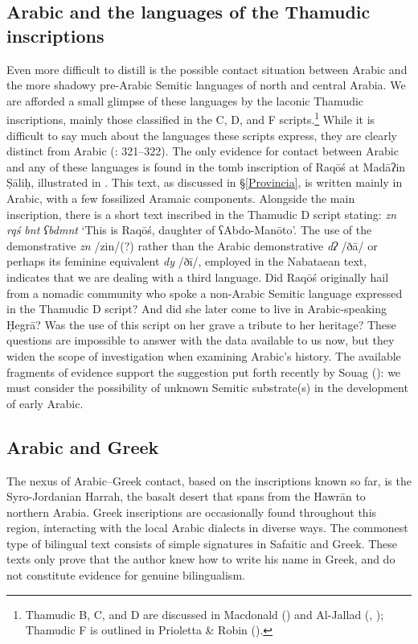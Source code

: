 \documentclass[output=paper]{langsci/langscibook}
\begin{document}
\subsection{Arabic and the languages of the Thamudic inscriptions}
Even more difficult to distill is the possible contact situation between Arabic and the more shadowy pre-Arabic Semitic languages of north and central Arabia. We are afforded a small glimpse of these languages by the laconic Thamudic inscriptions, mainly those classified in the C, D, and F scripts.\footnote{Thamudic B, C, and D are discussed in Macdonald (\citeyear{Macdonald2000}) and Al-Jallad (\citeyear{Al-Jallad2017early}, \citeyear{Al-Jallad2018ANA}); Thamudic F is outlined in Prioletta \& Robin (\citeyear{PriolettaRobin2018}).}  While it is difficult to say much about the languages these scripts express, they are clearly distinct from Arabic (\citealt{Al-Jallad2017early}: 321--322). The only evidence for contact between Arabic and any of these languages is found in the tomb inscription of Raqōś at Madāʔin Ṣāliḥ, illustrated in . This text, as discussed in §\ref{Provincia}, is written mainly in Arabic, with a few fossilized Aramaic components. Alongside the main inscription, there is a short text inscribed in the Thamudic D script stating: \textit{zn rqś bnt ʕbdmnt} ‘This is Raqōś, daughter of ʕAbdo-Manōto’. The use of the demonstrative \textit{zn} /zin/(?) rather than the Arabic demonstrative \textit{dʔ} /ðā/ or perhaps its feminine equivalent \textit{dy} /ðī/, employed in the Nabataean text, indicates that we are dealing with a third language. Did Raqōś originally hail from a nomadic community who spoke a non-Arabic Semitic language expressed in the Thamudic D script? And did she later come to live in Arabic-speaking Ḥegrā? Was the use of this script on her grave a tribute to her heritage? These questions are impossible to answer with the data available to us now, but they widen the scope of investigation when examining Arabic’s history. The available fragments of evidence support the suggestion put forth recently by Souag (\citeyear{Souag2018blog}): we must consider the possibility of unknown Semitic substrate(s) in the development of early Arabic.

\subsection{Arabic and Greek}
The nexus of Arabic--Greek contact, based on the inscriptions known so far, is the Syro-Jordanian Harrah, the basalt desert that spans from the Hawrān to northern Arabia. Greek inscriptions are occasionally found throughout this region, interacting with the local Arabic dialects in diverse ways. The commonest type of bilingual text consists of simple signatures in Safaitic and Greek. These texts only prove that the author knew how to write his name in Greek, and do not constitute evidence for genuine bilingualism. 
\end{document}

